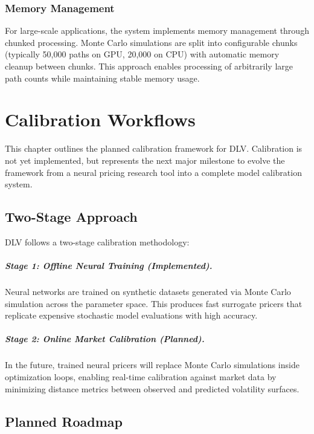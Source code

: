 	\subsection{Memory Management}
	
	For large-scale applications, the system implements memory management through chunked processing. Monte Carlo simulations are split into configurable chunks (typically 50,000 paths on GPU, 20,000 on CPU) with automatic memory cleanup between chunks. This approach enables processing of arbitrarily large path counts while maintaining stable memory usage.

	\chapter{Calibration Workflows}
	\label{ch:calib}
	
	This chapter outlines the planned calibration framework for DLV. 
	Calibration is not yet implemented, but represents the next major milestone
	to evolve the framework from a neural pricing research tool into a 
	complete model calibration system.
	
	\section{Two-Stage Approach}
	
	DLV follows a two-stage calibration methodology:
	
	\paragraph{Stage 1: Offline Neural Training (Implemented).}
	Neural networks are trained on synthetic datasets generated via Monte Carlo
	simulation across the parameter space. This produces fast surrogate pricers
	that replicate expensive stochastic model evaluations with high accuracy.
	
	\paragraph{Stage 2: Online Market Calibration (Planned).}
	In the future, trained neural pricers will replace Monte Carlo simulations
	inside optimization loops, enabling real-time calibration against market data
	by minimizing distance metrics between observed and predicted volatility surfaces.
	
	\section{Planned Roadmap}
	
